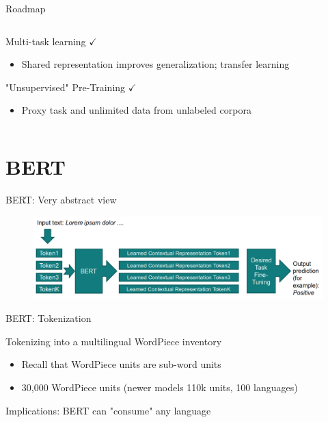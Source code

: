 \documentclass[12pt,aspectratio=169,handout]{beamer}
\begin{document}
\begin{frame}{Roadmap}
\begin{columns}
\begin{column}{0.5\linewidth}
			
			Multi-task learning $\checkmark$
			
			\begin{itemize}
				\item {\scriptsize Shared representation improves generalization; transfer learning}
			\end{itemize}
			
			"Unsupervised" Pre-Training $\checkmark$
			
			\begin{itemize}
				\item {\scriptsize Proxy task and unlimited data from unlabeled corpora}
			\end{itemize}
			
		\end{column}
		
	\end{columns}
	
\end{frame}


\section{BERT}


\begin{frame}{BERT: Very abstract view}
	
	\begin{figure}
		\includegraphics[width=\linewidth]{img/bert1.png}
	\end{figure}	
	
\end{frame}


\begin{frame}{BERT: Tokenization}
	
	Tokenizing into a multilingual WordPiece inventory
	
	\begin{itemize}
		\item Recall that WordPiece units are sub-word units
		\item 30,000 WordPiece units (newer models 110k units, 100 languages)
	\end{itemize}
	
	Implications: BERT can "consume" any language
	
	
\end{frame}
\end{document}
